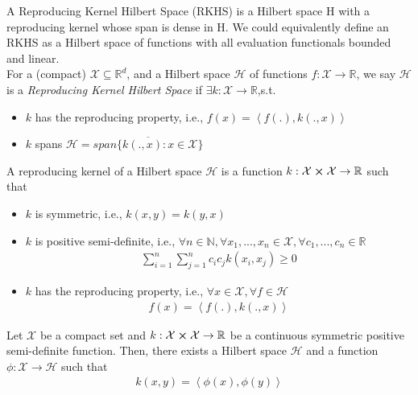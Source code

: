 \documentclass[12pt]{article}
\begin{document}
\begin{qsolve}
    A Reproducing Kernel Hilbert Space (RKHS) is a Hilbert space H with a reproducing kernel whose span
    is dense in H. We could equivalently define an RKHS as a Hilbert space of functions with all evaluation
    functionals bounded and linear.
    \\For a (compact) $\mathcal{X} \subseteq \mathbb{R}^d$, and a Hilbert space $\mathcal{H}$ of functions $f:\mathcal{X} \rightarrow \mathbb{R}$, we say $\mathcal{H}$ is a \textit{Reproducing Kernel Hilbert Space} if $\exists k : \mathcal{X} \rightarrow \mathbb{R}$,s.t.
    \begin{itemize}
        \item  $k$ has the reproducing property, i.e., $f(x) = \left\langle  f(.),k(.,x) \right\rangle $
        \item  $k$ spans $\mathcal{H} = \overline{span\{k(.,x):x \in \mathcal{X}\}}$
    \end{itemize}
\end{qsolve}

\begin{qsolve}
    A reproducing kernel of a Hilbert space $\mathcal{H}$ is a function $k:\mathcal{X} \cross \mathcal{X} \rightarrow \mathbb{R}$ such that
    \begin{itemize}
        \item $k$ is symmetric, i.e., $k(x,y) = k(y,x)$
        \item $k$ is positive semi-definite, i.e., $\forall n \in \mathbb{N}, \forall x_1,...,x_n \in \mathcal{X}, \forall c_1,...,c_n \in \mathbb{R}$
              \begin{gather*}
                  \sum_{i=1}^{n} \sum_{j=1}^{n} c_i c_j k(x_i,x_j) \geq 0
              \end{gather*}
        \item $k$ has the reproducing property, i.e., $\forall x \in \mathcal{X}, \forall f \in \mathcal{H}$
              \begin{gather*}
                  f(x) = \left\langle  f(.),k(.,x) \right\rangle
              \end{gather*}
    \end{itemize}
\end{qsolve}

\begin{qsolve}
    Let $\mathcal{X}$ be a compact set and $k:\mathcal{X} \cross \mathcal{X} \rightarrow \mathbb{R}$ be a continuous symmetric positive semi-definite function. Then, there exists a Hilbert space $\mathcal{H}$ and a function $\phi:\mathcal{X} \rightarrow \mathcal{H}$ such that
    \begin{gather*}
        k(x,y) = \left\langle  \phi(x),\phi(y) \right\rangle
    \end{gather*}
\end{qsolve}
\end{document}
